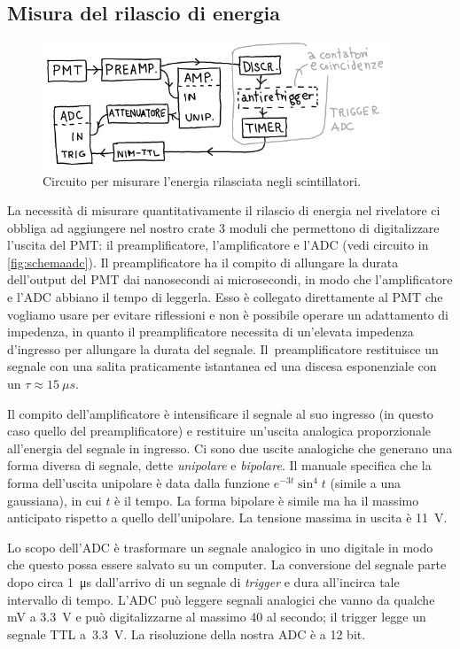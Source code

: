 \subsection{Misura del rilascio di energia}

\begin{figure}
	\centering
	\includegraphics[width=28em]{schemaadc}
	\caption{\label{fig:schemaadc}
	Circuito per misurare l'energia rilasciata negli scintillatori.}
\end{figure}

La necessità di misurare quantitativamente il rilascio di energia nel rivelatore ci obbliga ad aggiungere nel nostro crate 3 moduli che permettono di digitalizzare l'uscita del PMT: il preamplificatore, l'amplificatore e l'ADC
(vedi circuito in \autoref{fig:schemaadc}).
Il preamplificatore ha il compito di allungare la durata dell'output del PMT dai nanosecondi ai microsecondi, in modo che l'amplificatore e l'ADC abbiano il tempo di leggerla. Esso è collegato direttamente al PMT che vogliamo usare per evitare riflessioni e non è possibile operare un adattamento di impedenza, in quanto il preamplificatore necessita di un'elevata impedenza d'ingresso per allungare la durata del segnale. 
Il~preamplificatore restituisce un segnale con una salita praticamente istantanea
ed una discesa esponenziale con un $\tau\approx\SI{15}{\mu s}$.

Il compito dell'amplificatore è intensificare il segnale al suo ingresso
(in questo caso quello del preamplificatore)
e restituire un'uscita analogica proporzionale all'energia del segnale in ingresso.
Ci sono due uscite analogiche che generano una forma diversa di segnale,
dette \emph{unipolare} e \emph{bipolare}.
Il manuale specifica che la forma dell'uscita unipolare
è data dalla funzione $e^{-3t}\sin^4{t}$ (simile a una gaussiana), in cui $t$ è il tempo.
La forma bipolare è simile ma ha il massimo anticipato rispetto a quello dell'unipolare.
La tensione massima in uscita è \SI{11}{V}.

Lo scopo dell'ADC è trasformare un segnale analogico in uno digitale
in modo che questo possa essere salvato su un computer.  
La conversione del segnale parte dopo circa \SI{1}{\micro s} dall'arrivo di un segnale di \emph{trigger} e dura all'incirca tale intervallo di tempo. L'ADC può leggere segnali analogici che vanno da qualche \si{mV} a \SI{3.3}{V} e può digitalizzarne al massimo 40 al secondo;
il trigger legge un segnale TTL a~\SI{3.3}{V}. La risoluzione della nostra ADC è a 12 bit.

